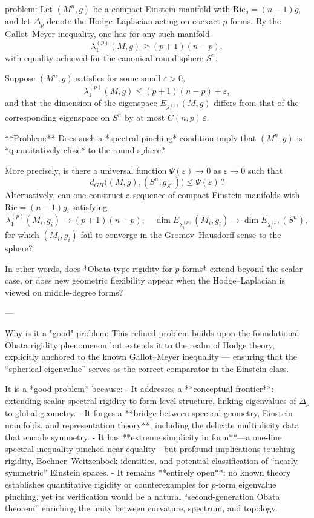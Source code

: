 problem:  
Let \((M^n,g)\) be a compact Einstein manifold with \(\mathrm{Ric}_g = (n-1)g\), and let \(\Delta_p\) denote the Hodge–Laplacian acting on coexact \(p\)-forms.  
By the Gallot–Meyer inequality, one has for any such manifold  
\[
\lambda_1^{(p)}(M,g) \ge (p+1)(n-p),
\]
with equality achieved for the canonical round sphere \(S^n\).  

Suppose \((M^n,g)\) satisfies for some small \(\varepsilon > 0\),
\[
\lambda_1^{(p)}(M,g) \le (p+1)(n-p) + \varepsilon,
\]
and that the dimension of the eigenspace \(E_{\lambda_1^{(p)}}(M,g)\) differs from that of the corresponding eigenspace on \(S^n\) by at most \(C(n,p)\,\varepsilon\).  

**Problem:**  
Does such a *spectral pinching* condition imply that \((M^n,g)\) is *quantitatively close* to the round sphere?  

More precisely, is there a universal function \(\Psi(\varepsilon)\to 0\) as \(\varepsilon \to 0\) such that  
\[
d_{GH}\big((M,g),(S^n,g_{S^n})\big)\le \Psi(\varepsilon)\,?
\]  
Alternatively, can one construct a sequence of compact Einstein manifolds with \(\mathrm{Ric}=(n-1)g_i\) satisfying  
\[
\lambda_1^{(p)}(M_i,g_i)\to (p+1)(n-p), \quad \dim E_{\lambda_1^{(p)}}(M_i,g_i)\to \dim E_{\lambda_1^{(p)}}(S^n),
\]
for which \((M_i,g_i)\) fail to converge in the Gromov–Hausdorff sense to the sphere?  

In other words, does *Obata-type rigidity for \(p\)-forms* extend beyond the scalar case, or does new geometric flexibility appear when the Hodge–Laplacian is viewed on middle-degree forms?

---

Why is it a "good" problem:  
This refined problem builds upon the foundational Obata rigidity phenomenon but extends it to the realm of Hodge theory, explicitly anchored to the known Gallot–Meyer inequality — ensuring that the “spherical eigenvalue” serves as the correct comparator in the Einstein class.  

It is a *good problem* because:  
- It addresses a **conceptual frontier**: extending scalar spectral rigidity to form-level structure, linking eigenvalues of \(\Delta_p\) to global geometry.  
- It forges a **bridge between spectral geometry, Einstein manifolds, and representation theory**, including the delicate multiplicity data that encode symmetry.  
- It has **extreme simplicity in form**—a one-line spectral inequality pinched near equality—but profound implications touching rigidity, Bochner–Weitzenböck identities, and potential classification of “nearly symmetric” Einstein spaces.  
- It remains **entirely open**: no known theory establishes quantitative rigidity or counterexamples for \(p\)-form eigenvalue pinching, yet its verification would be a natural “second-generation Obata theorem” enriching the unity between curvature, spectrum, and topology.